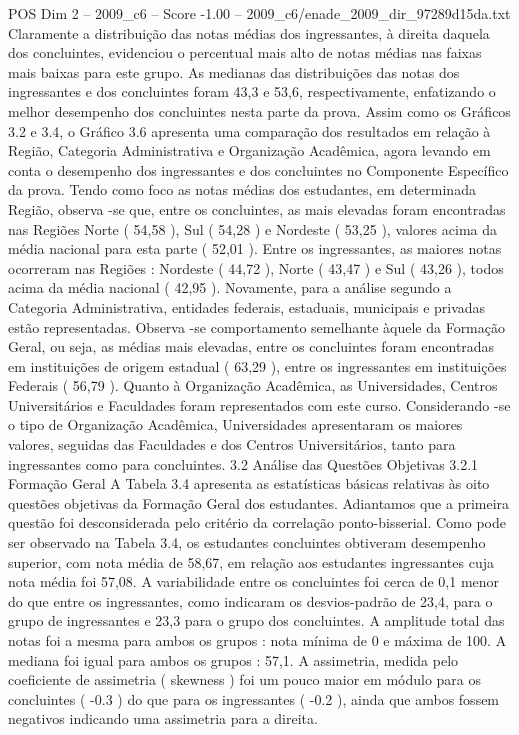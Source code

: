 \begin{textsample}{POS Dim 2 – 2009\_c6 – Score -1.00 – 2009\_c6/enade\_2009\_dir\_97289d15da.txt}
Claramente a distribuição das notas médias dos ingressantes, à direita daquela dos concluintes, evidenciou o percentual mais alto de notas médias nas faixas mais baixas para este grupo.
As medianas das distribuições das notas dos ingressantes e dos concluintes foram 43,3 e 53,6, respectivamente, enfatizando o melhor desempenho dos concluintes nesta parte da prova.
Assim como os Gráficos 3.2 e 3.4, o Gráfico 3.6 apresenta uma comparação dos resultados em relação à Região, Categoria Administrativa e Organização Acadêmica, agora levando em conta o desempenho dos ingressantes e dos concluintes no Componente Específico da prova.
Tendo como foco as notas médias dos estudantes, em determinada Região, observa -se que, entre os concluintes, as mais elevadas foram encontradas nas Regiões Norte ( 54,58 ), Sul ( 54,28 ) e Nordeste ( 53,25 ), valores acima da média nacional para esta parte ( 52,01 ).
Entre os ingressantes, as maiores notas ocorreram nas Regiões : Nordeste ( 44,72 ), Norte ( 43,47 ) e Sul ( 43,26 ), todos acima da média nacional ( 42,95 ).
Novamente, para a análise segundo a Categoria Administrativa, entidades federais, estaduais, municipais e privadas estão representadas.
Observa -se comportamento semelhante àquele da Formação Geral, ou seja, as médias mais elevadas, entre os concluintes foram encontradas em instituições de origem estadual ( 63,29 ), entre os ingressantes em instituições Federais ( 56,79 ).
Quanto à Organização Acadêmica, as Universidades, Centros Universitários e Faculdades foram representados com este curso.
Considerando -se o tipo de Organização Acadêmica, Universidades apresentaram os maiores valores, seguidas das Faculdades e dos Centros Universitários, tanto para ingressantes como para concluintes. 3.2 Análise das Questões Objetivas 3.2.1 Formação Geral A Tabela 3.4 apresenta as estatísticas básicas relativas às oito questões objetivas da Formação Geral dos estudantes.
Adiantamos que a primeira questão foi desconsiderada pelo critério da correlação ponto-bisserial.
Como pode ser observado na Tabela 3.4, os estudantes concluintes obtiveram desempenho superior, com nota média de 58,67, em relação aos estudantes ingressantes cuja nota média foi 57,08.
A variabilidade entre os concluintes foi cerca de 0,1 menor do que entre os ingressantes, como indicaram os desvios-padrão de 23,4, para o grupo de ingressantes e 23,3 para o grupo dos concluintes.
A amplitude total das notas foi a mesma para ambos os grupos : nota mínima de 0 e máxima de 100.
A mediana foi igual para ambos os grupos : 57,1.
A assimetria, medida pelo coeficiente de assimetria ( skewness ) foi um pouco maior em módulo para os concluintes ( -0.3 ) do que para os ingressantes ( -0.2 ), ainda que ambos fossem negativos indicando uma assimetria para a direita.

\end{textsample}
